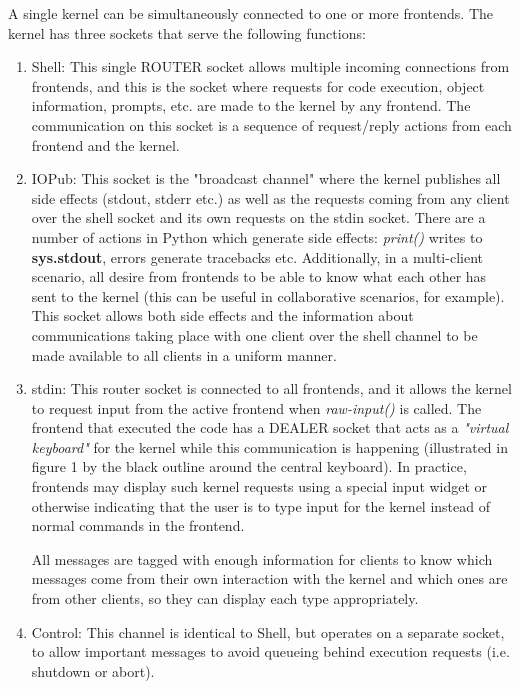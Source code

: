A single kernel can be simultaneously connected to one or more frontends. The kernel has
three sockets that serve the following functions:
\begin{enumerate}
\item Shell: This single ROUTER socket allows multiple incoming connections from
  frontends, and this is the socket where requests for code execution, object information,
  prompts, etc.  are made to the kernel by any frontend. The communication on this socket
  is a sequence of request/reply actions from each frontend and the kernel.
\item IOPub: This socket is the "broadcast channel" where the kernel publishes all side
  effects (stdout, stderr etc.) as well as the requests coming from any client over the
  shell socket and its own requests on the stdin socket. There are a number of actions in
  Python which generate side effects: \textit{print()} writes to \textbf{sys.stdout},
  errors generate tracebacks etc. Additionally, in a multi-client scenario, all desire from frontends to be able to know what each other has sent to the kernel (this can be useful
  in collaborative scenarios, for example). This socket allows both side effects and the
  information about communications taking place with one client over the shell channel to
  be made available to all clients in a uniform manner.
\item stdin: This router socket is connected to all frontends, and it allows the kernel to
  request input from the active frontend when \textit{raw-input()} is called. The frontend
  that executed the code has a DEALER socket that acts as a \textit{"virtual keyboard"} for the
  kernel while this communication is happening (illustrated in figure 1 by the black
  outline around the central keyboard). In practice, frontends may display such kernel
  requests using a special input widget or otherwise indicating that the user is to type
  input for the kernel instead of normal commands in the frontend.

  All messages are tagged with enough information for clients to know
  which messages come from their own interaction with the kernel and which ones are from
  other clients, so they can display each type appropriately.
\item Control: This channel is identical to Shell, but operates on a separate socket, to
  allow important messages to avoid queueing behind execution requests (i.e. shutdown or
  abort).
\end{enumerate} 


